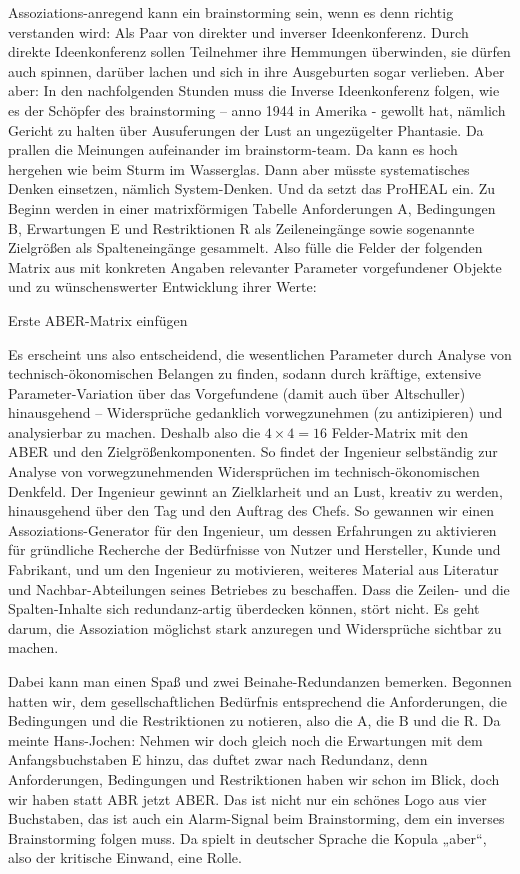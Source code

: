 \documentclass[12pt,a4paper]{article}
\begin{document}
Assoziations-anregend kann ein brainstorming sein, wenn es denn richtig
verstanden wird: Als Paar von direkter und inverser Ideenkonferenz. Durch
direkte Ideenkonferenz sollen Teilnehmer ihre Hemmungen überwinden, sie dürfen
auch spinnen, darüber lachen und sich in ihre Ausgeburten sogar verlieben. Aber
aber: In den nachfolgenden Stunden muss die Inverse Ideenkonferenz folgen, wie
es der Schöpfer des brainstorming – anno 1944 in Amerika - gewollt hat, nämlich
Gericht zu halten über Ausuferungen der Lust an ungezügelter Phantasie. Da
prallen die Meinungen aufeinander im brainstorm-team. Da kann es hoch hergehen
wie beim Sturm im Wasserglas. Dann aber müsste systematisches Denken einsetzen,
nämlich System-Denken. Und da setzt das ProHEAL ein. Zu Beginn werden in einer
matrixförmigen Tabelle Anforderungen A, Bedingungen B, Erwartungen E und
Restriktionen R als Zeileneingänge sowie sogenannte Zielgrößen als
Spalteneingänge gesammelt. Also fülle die Felder der folgenden Matrix aus mit
konkreten Angaben relevanter Parameter vorgefundener Objekte und zu
wünschenswerter Entwicklung ihrer Werte:
\begin{center}
  Erste ABER-Matrix einfügen
\end{center}

Es erscheint uns also entscheidend, die wesentlichen Parameter durch Analyse
von technisch-ökonomischen Belangen zu finden, sodann durch kräftige, extensive
Parameter-Variation über das Vorgefundene (damit auch über Altschuller)
hinausgehend – Widersprüche gedanklich vorwegzunehmen (zu antizipieren) und
analysierbar zu machen. Deshalb also die $4\times 4 = 16$ Felder-Matrix mit den
ABER und den Zielgrößenkomponenten. So findet der Ingenieur selbständig zur
Analyse von vorwegzunehmenden Widersprüchen im technisch-ökonomischen
Denkfeld. Der Ingenieur gewinnt an Zielklarheit und an Lust, kreativ zu werden,
hinausgehend über den Tag und den Auftrag des Chefs. So gewannen wir einen
Assoziations-Generator für den Ingenieur, um dessen Erfahrungen zu aktivieren
für gründliche Recherche der Bedürfnisse von Nutzer und Hersteller, Kunde und
Fabrikant, und um den Ingenieur zu motivieren, weiteres Material aus Literatur
und Nachbar-Abteilungen seines Betriebes zu beschaffen. Dass die Zeilen- und
die Spalten-Inhalte sich redundanz-artig überdecken können, stört nicht. Es
geht darum, die Assoziation möglichst stark anzuregen und Widersprüche sichtbar
zu machen.

Dabei kann man einen Spaß und zwei Beinahe-Redundanzen bemerken. Begonnen
hatten wir, dem gesellschaftlichen Bedürfnis entsprechend die Anforderungen,
die Bedingungen und die Restriktionen zu notieren, also die A, die B und die R.
Da meinte Hans-Jochen: Nehmen wir doch gleich noch die Erwartungen mit dem
Anfangsbuchstaben E hinzu, das duftet zwar nach Redundanz, denn Anforderungen,
Bedingungen und Restriktionen haben wir schon im Blick, doch wir haben statt
ABR jetzt ABER. Das ist nicht nur ein schönes Logo aus vier Buchstaben, das ist
auch ein Alarm-Signal beim Brainstorming, dem ein inverses Brainstorming folgen
muss. Da spielt in deutscher Sprache die Kopula „aber“, also der kritische
Einwand, eine Rolle.
\end{document}

